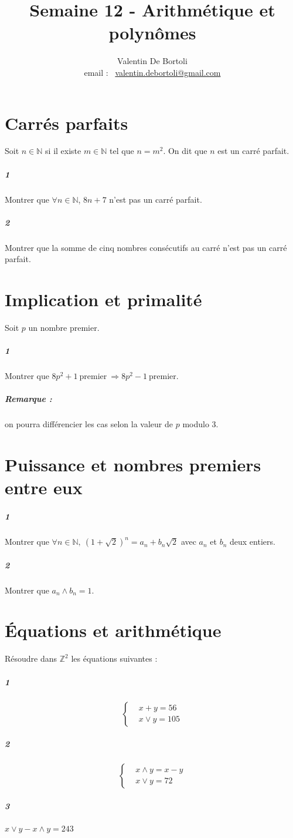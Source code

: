 \documentclass[10pt,a4paper]{article}
\title{Semaine 12 - Arithmétique et polynômes}
\author{Valentin De Bortoli \\ email : \ \href{mailto:valentin.debortoli@gmail.com}{valentin.debortoli@gmail.com}}
\date{}
\begin{document}
\maketitle
\section{Carrés parfaits}
Soit $n \in \mathbb{N}$ si il existe $m \in \mathbb{N}$ tel que $n=m^2$. On dit que $n$ est un carré parfait.
\subparagraph{1}Montrer que $\forall n \in \mathbb{N}$, $8n+7$ n'est pas un carré parfait.
\subparagraph{2}Montrer que la somme de cinq nombres consécutifs au carré n'est pas un carré parfait.
\section{Implication et primalité}
Soit $p$ un nombre premier.
\subparagraph{1}Montrer que $8p^2+1 \ \text{premier} \ \Rightarrow 8p^2-1 \ \text{premier}.$
\subparagraph{Remarque :} on pourra différencier les cas selon la valeur de $p$ modulo 3.
\section{Puissance et nombres premiers entre eux}
\subparagraph{1}Montrer que $\forall n \in \mathbb{N}, \ (1+\sqrt{2})^n=a_n+b_n\sqrt{2}$ avec $a_n$ et $b_n$ deux entiers.
\subparagraph{2}Montrer que $a_n \wedge b_n=1$.
\section{Équations et arithmétique}
Résoudre dans $\mathbb{Z}^2$ les équations suivantes :
\subparagraph{1} \begin{equation*}
\left\lbrace
\begin{aligned}
&x+y=56 \\
& x \vee y =105
\end{aligned}
\right.
\end{equation*}
\subparagraph{2}
\begin{equation*}
\left\lbrace
\begin{aligned}
&x \wedge y = x-y \\
&x \vee y =72
\end{aligned}
\right.
\end{equation*}
\subparagraph{3} $x \vee y - x \wedge y=243$
\end{document}
